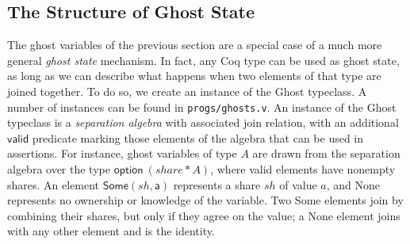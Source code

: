 \documentclass[11pt]{article}
\begin{document}
\subsection{The Structure of Ghost State}
The ghost variables of the previous section are a special case of a much more general \emph{ghost state} mechanism. In fact, any Coq type can be used as ghost state, as long as we can describe what happens when two elements of that type are joined together. To do so, we create an instance of the \textsf{Ghost} typeclass. A number of instances can be found in \texttt{progs/ghosts.v}. An instance of the \textsf{Ghost} typeclass is a \emph{separation algebra} with associated \textsf{join} relation, with an additional $\mathsf{valid}$ predicate marking those elements of the algebra that can be used in assertions. For instance, ghost variables of type $A$ are drawn from the separation algebra over the type $\mathsf{option}\ (share * A)$, where valid elements have nonempty shares. An element $\mathsf{Some (\mathit{sh}, a)}$ represents a share $\mathit{sh}$ of value $a$, and \textsf{None} represents no ownership or knowledge of the variable. Two \textsf{Some} elements join by combining their shares, but only if they agree on the value; a \textsf{None} element joins with any other element and is the identity.
\end{document}
